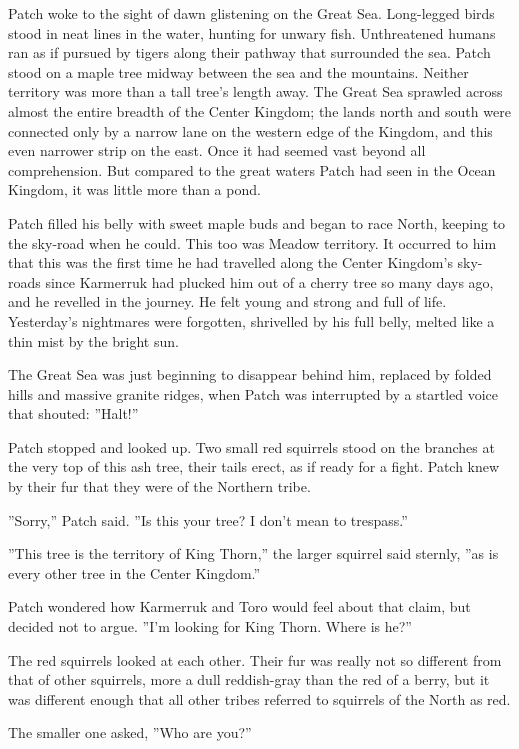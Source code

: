 \documentclass[12pt]{book}
\begin{document}
 Patch woke to the sight of dawn glistening on the Great Sea. Long-legged birds stood in neat lines in the water, hunting for unwary fish. Unthreatened humans ran as if pursued by tigers along their pathway that surrounded the sea. Patch stood on a maple tree midway between the sea and the mountains. Neither territory was more than a tall tree's length away. The Great Sea sprawled across almost the entire breadth of the Center Kingdom; the lands north and south were connected only by a narrow lane on the western edge of the Kingdom, and this even narrower strip on the east. Once it had seemed vast beyond all comprehension. But compared to the great waters Patch had seen in the Ocean Kingdom, it was little more than a pond.\par
 Patch filled his belly with sweet maple buds and began to race North, keeping to the sky-road when he could. This too was Meadow territory. It occurred to him that this was the first time he had travelled along the Center Kingdom's sky-roads since Karmerruk had plucked him out of a cherry tree so many days ago, and he revelled in the journey. He felt young and strong and full of life. Yesterday's nightmares were forgotten, shrivelled by his full belly, melted like a thin mist by the bright sun.\par
 The Great Sea was just beginning to disappear behind him, replaced by folded hills and massive granite ridges, when Patch was interrupted by a startled voice that shouted: ''Halt!''\par
 Patch stopped and looked up. Two small red squirrels stood on the branches at the very top of this ash tree, their tails erect, as if ready for a fight. Patch knew by their fur that they were of the Northern tribe.\par
 ''Sorry,'' Patch said. ''Is this your tree? I don't mean to trespass.''\par
 ''This tree is the territory of King Thorn,'' the larger squirrel said sternly, ''as is every other tree in the Center Kingdom.''\par
 Patch wondered how Karmerruk and Toro would feel about that claim, but decided not to argue. ''I'm looking for King Thorn. Where is he?''\par
 The red squirrels looked at each other. Their fur was really not so different from that of other squirrels, more a dull reddish-gray than the red of a berry, but it was different enough that all other tribes referred to squirrels of the North as red.\par
The smaller one asked, ''Who are you?''\par
\end{document}
